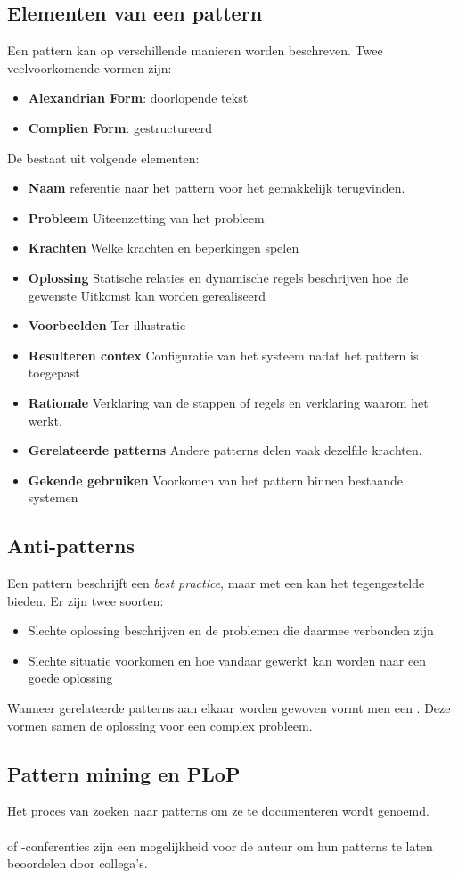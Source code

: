 \documentclass[../../main.tex]{subfiles}
\begin{document}
\subsection{Elementen van een pattern}
Een pattern kan op verschillende manieren worden beschreven. Twee veelvoorkomende vormen zijn:
\begin{itemize}
	\item \textbf{Alexandrian Form}: doorlopende tekst
	\item \textbf{Complien Form}: gestructureerd
\end{itemize}
De  bestaat uit volgende elementen:
\begin{itemize}
	\item \textbf{Naam} referentie naar het pattern voor het gemakkelijk terugvinden.
	\item \textbf{Probleem} Uiteenzetting van het probleem
	\item \textbf{Krachten} Welke krachten en beperkingen spelen
	\item \textbf{Oplossing} Statische relaties en dynamische regels beschrijven hoe de gewenste Uitkomst kan worden gerealiseerd
	\item \textbf{Voorbeelden} Ter illustratie
	\item \textbf{Resulteren contex} Configuratie van het systeem nadat het pattern is toegepast
	\item \textbf{Rationale} Verklaring van de stappen of regels en verklaring waarom het werkt.
	\item \textbf{Gerelateerde patterns} Andere patterns delen vaak dezelfde krachten.
	\item \textbf{Gekende gebruiken} Voorkomen van het pattern binnen bestaande systemen
\end{itemize}
\subsection{Anti-patterns}
Een pattern beschrijft een \textit{best practice}, maar met een  kan het tegengestelde bieden. Er zijn twee soorten:
\begin{itemize}
	\item Slechte oplossing beschrijven en de problemen die daarmee verbonden zijn
	\item Slechte situatie voorkomen en hoe vandaar gewerkt kan worden naar een goede oplossing
\end{itemize}
Wanneer gerelateerde patterns aan elkaar worden gewoven vormt men een . Deze vormen samen de oplossing voor een complex probleem.
\subsection{Pattern mining en PLoP}
Het proces van zoeken naar patterns om ze te documenteren wordt  genoemd.\\
\\
 of -conferenties zijn een mogelijkheid voor de auteur om hun patterns te laten beoordelen door collega's.
\end{document}
